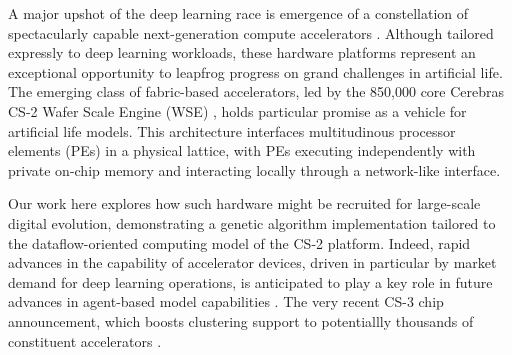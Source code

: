 

A major upshot of the deep learning race is emergence of a constellation of spectacularly capable next-generation compute accelerators \citep{zhang2016cambricon,emani2021accelerating,jia2019dissecting,medina2020habana}.
Although tailored expressly to deep learning workloads, these hardware platforms represent an exceptional opportunity to leapfrog progress on grand challenges in artificial life.
The emerging class of fabric-based accelerators, led by the 850,000 core Cerebras CS-2 Wafer Scale Engine (WSE) \citep{lauterbach2021path,lie2022cerebras}, holds particular promise as a vehicle for artificial life models.
This architecture interfaces multitudinous processor elements (PEs) in a physical lattice, with PEs executing independently with private on-chip memory and interacting locally through a network-like interface.

Our work here explores how such hardware might be recruited for large-scale digital evolution, demonstrating a genetic algorithm implementation tailored to the dataflow-oriented computing model of the CS-2 platform.
Indeed, rapid advances in the capability of accelerator devices, driven in particular by market demand for deep learning operations, is anticipated to play a key role in future advances in agent-based model capabilities \citep{perumalla2022computer}.
The very recent CS-3 chip announcement, which boosts clustering support to potentiallly thousands of constituent accelerators \citep{moore2024cerebras}.


